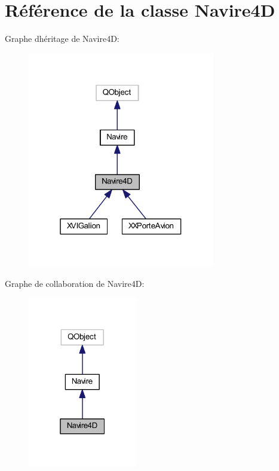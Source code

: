 \hypertarget{class_navire4_d}{}\section{Référence de la classe Navire4D}
\label{class_navire4_d}


Graphe d\textquotesingle{}héritage de Navire4D\+:
\nopagebreak
\begin{figure}[H]
\begin{center}
\leavevmode
\includegraphics[width=232pt]{class_navire4_d__inherit__graph}
\end{center}
\end{figure}


Graphe de collaboration de Navire4D\+:
\nopagebreak
\begin{figure}[H]
\begin{center}
\leavevmode
\includegraphics[width=135pt]{class_navire4_d__coll__graph}
\end{center}
\end{figure}
